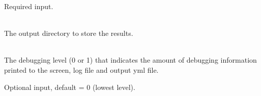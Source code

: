 \begin{description}[topsep=0pt,parsep=0.5em,itemsep=-0.4em]
\begin{description}[topsep=0pt,parsep=0.5em,itemsep=-0.4em]
                Required input.
    \item[{output directory}]\hfill
      \\The output directory to store the results.
    \item[{debug}]\hfill
\\The debugging level (0 or 1) that indicates the amount of debugging 
                information printed to the screen, log file and output yml file. 
                
                Optional input, default = 0 (lowest level).
  \end{description}
\end{description}
